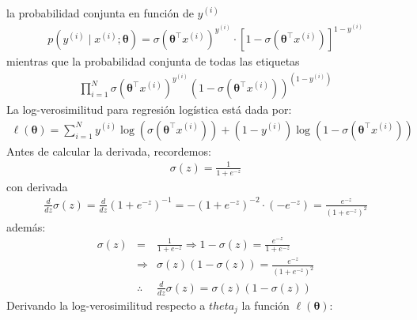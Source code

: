 \documentclass[12pt]{article}
\begin{document}
la probabilidad conjunta en función de $y^{(i)}$
\begin{eqnarray}
p\left(y^{(i)} \mid x^{(i)}; \boldsymbol{\theta} \right) = 
\sigma(\boldsymbol{\theta}^{\top} x^{(i)})^{y^{(i)}} \cdot \left[1 - \sigma(\boldsymbol{\theta}^{\top} x^{(i)}) \right]^{1 - y^{(i)}}
\end{eqnarray}
mientras que la probabilidad conjunta de todas las etiquetas
\begin{eqnarray}
\prod_{i=1}^{N} \sigma(\boldsymbol{\theta}^{\top} x^{(i)})^{y^{(i)}} \left(1 - \sigma(\boldsymbol{\theta}^{\top} x^{(i)}) \right)^{(1 - y^{(i)})}
\end{eqnarray}
La log-verosimilitud para regresión logística está dada por:
\begin{eqnarray}
\ell(\boldsymbol{\theta}) = \sum_{i=1}^{N} y^{(i)} \log \left( \sigma(\boldsymbol{\theta}^{\top} x^{(i)}) \right) + 
(1 - y^{(i)}) \log \left( 1 - \sigma(\boldsymbol{\theta}^{\top} x^{(i)}) \right)
\end{eqnarray}
Antes de calcular la derivada, recordemos:
\begin{eqnarray}
\sigma(z) = \frac{1}{1 + e^{-z}}
\end{eqnarray}
con derivada
\begin{eqnarray}
\frac{d}{dz} \sigma(z) = \frac{d}{dz} \left(1 + e^{-z} \right)^{-1} = 
-(1 + e^{-z})^{-2} \cdot (-e^{-z}) =
\frac{e^{-z}}{(1 + e^{-z})^2}
\end{eqnarray}
además:
\begin{eqnarray}
\sigma(z) &=& \frac{1}{1 + e^{-z}} \Rightarrow 1 - \sigma(z) = \frac{e^{-z}}{1 + e^{-z}}\\
&\Rightarrow& \sigma(z)(1 - \sigma(z)) = \frac{e^{-z}}{(1 + e^{-z})^2}\\
&\therefore& \frac{d}{dz} \sigma(z) = \sigma(z)(1 - \sigma(z))
\end{eqnarray}
Derivando la log-verosimilitud respecto a $theta_{j}$ la función $\ell(\boldsymbol{\theta})$:
\end{document}

